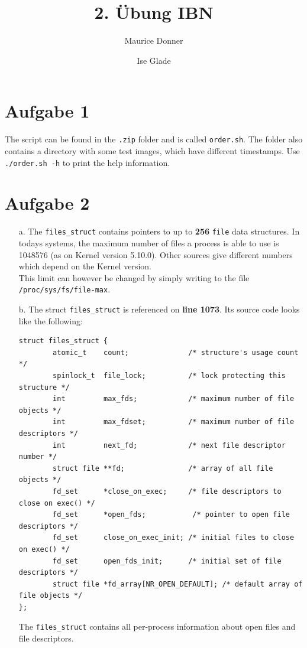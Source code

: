 \documentclass{article}
\title{\textsf{\color{blue!40!black}2. Übung IBN}}
\author{Maurice Donner \and Ise Glade}
\begin{document}
\maketitle

\section*{Aufgabe 1}
The script can be found in the \texttt{.zip} folder and is called \texttt{order.sh}.
The folder also contains a directory with some test images, which have different
timestamps. Use \texttt{./order.sh -h} to print the help information.

\section*{Aufgabe 2}
\begin{itemize}
    \item[a.] The \texttt{files\_struct} contains pointers to up to \textbf{256}
	\texttt{file} data structures. In todays systems, the maximum number of
	files a process is able to use is 1048576 (as on Kernel version 5.10.0).
	Other sources give different numbers which depend on the Kernel version.
	\\ This limit can however be changed by simply writing to the file\\
	\texttt{/proc/sys/fs/file-max}.
    \item[b.] The struct \texttt{files\_struct} is referenced on \textbf{line 1073}.
	Its source code looks like the following:
\begin{lstlisting}
struct files_struct {
        atomic_t    count;              /* structure's usage count */
        spinlock_t  file_lock;          /* lock protecting this structure */
        int         max_fds;            /* maximum number of file objects */
        int         max_fdset;          /* maximum number of file descriptors */
        int         next_fd;            /* next file descriptor number */
        struct file **fd;               /* array of all file objects */
        fd_set      *close_on_exec;     /* file descriptors to close on exec() */
        fd_set      *open_fds;           /* pointer to open file descriptors */
        fd_set      close_on_exec_init; /* initial files to close on exec() */
        fd_set      open_fds_init;      /* initial set of file descriptors */
        struct file *fd_array[NR_OPEN_DEFAULT]; /* default array of file objects */
};
\end{lstlisting}
The \texttt{files\_struct} contains all per-process information about open files
and file descriptors.
\end{itemize}
\newpage
\end{document}
